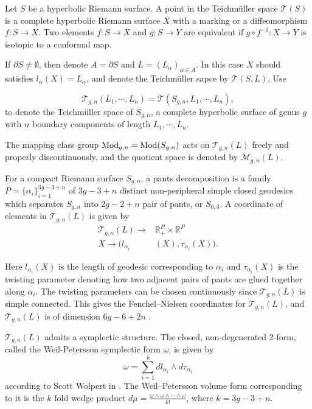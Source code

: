 \newtheorem{thma}{Theorem A}

Let $S$ be a hyperbolic Riemann surface. A point in the Teichm\"uller space $\mathscr{T}(S)$ is a complete hyperbolic Riemann surface $X$ with a marking or a diffeomorphism $f:S\to X$. Two elements $f:S\to X$ and $g:S\to Y$ are equivalent if $g\circ f^{-1}:X\to Y$ is isotopic to a conformal map. 

If $\partial S\neq \emptyset$, then denote $A=\partial S$ and $L=(L_\alpha)_{\alpha\in A}$. In this case $X$ should satisfies $l_\alpha(X)=L_\alpha$, and denote the Teichm\"uller sapce by $\mathscr{T}(S,L)$, Use 

$$
\mathscr{T}_{g,n}(L_1,\cdots,L_n)=\mathscr{T}(S_{g,n},L_1,\cdots,L_n),
$$
 to denote the Teichm\"uller space of $S_{g,n}$, a complete hyperbolic surface  of genus $g$ with $n$ boundary components of length $L_1,\cdots,L_n.$
 
 The mapping class group $\operatorname{Mod}_{g,n}=\operatorname{Mod}(S_{g,n})$ acts on $\mathscr{T}_{g,n}(L)$ freely and properly discontinuously, and the quotient space is denoted by $\mathscr{M}_{g,n}(L)$.

For a compact Riemann surface  $S_{g,n}$, a pants decomposition  is a family $P= \{\alpha_i\}_{i=1}^{3g-3+n}$ of $3g-3+n$ distinct non-peripheral simple closed geodesics which separates $S_{g,n}$ into $2g-2+n$  pair of pants, or  $S_{0,3}$.  A coordinate of elements in $\mathscr{T}_{g,n}(L)$ is given by 
\begin{align*}
\mathscr{T}_{g,n}(L)\to & \mathbb{R}_+^P\times \mathbb{R}^P\\
X\to (l_{\alpha_i}&(X),\tau_{\alpha_i}(X)). 
\end{align*}

Here $l_{\alpha_i}(X)$ is the length of geodesic corresponding to $\alpha_i$ and $\tau_{\alpha_i}(X)$ is the twisting parameter denoting how two adjacent pairs of pants  are glued together along $\alpha_i$. The twisting  parameters can be chosen continuously since $\mathscr{T}_{g,n}(L)$ is simple connected. This gives the Fenchel--Nielsen coordinates for $\mathscr{T}_{g,n}(L)$, and $\mathscr{T}_{g,n}(L)$ is of dimension $6g-6+2n$ .



$\mathscr{T}_{g,n}(L)$ admits a symplectic structure.  The closed, non-degenerated   2-form, called the Weil-Petersson symplectic form $\omega$, is given by
$$
\omega=\sum_{i=1}^k dl_{\alpha_i}\wedge d\tau_{\alpha_i}
$$
according to Scott Wolpert in \cite{wolpertformula}. The Weil--Petersson volume form corresponding to it is the $k$ fold wedge product  $d\mu=\frac{\omega\wedge\omega\wedge\cdots\wedge\omega}{k!}$, where $k=3g-3+n$.

